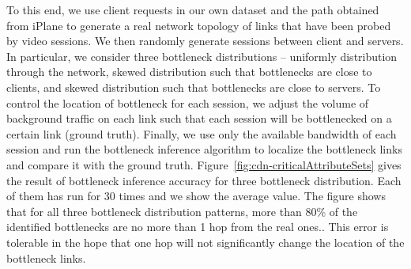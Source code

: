 To this end, we use client requests in our own dataset and the path obtained from iPlane to generate a real network topology of links that have been probed by video sessions. We then randomly generate sessions between client and servers. In particular, we consider three bottleneck distributions -- uniformly distribution through the network, skewed distribution such that bottlenecks are close to clients, and skewed distribution such that bottlenecks are close to servers. To control the location of bottleneck for each session, we adjust the volume of background traffic on each link such that each session will be bottlenecked on a certain link (ground truth). Finally, we use only the available bandwidth of each session and run the bottleneck inference algorithm to localize the bottleneck links and compare it with the ground truth. Figure~\ref{fig:cdn-criticalAttributeSets} gives the result of bottleneck inference accuracy for three bottleneck distribution. Each of them has run for 30 times and we show the average value. The figure shows that for all three bottleneck distribution patterns, more than 80\% of the identified bottlenecks are no more than 1 hop from the real ones.. This error is tolerable in the hope that one hop will not significantly change the location of the bottleneck links.

